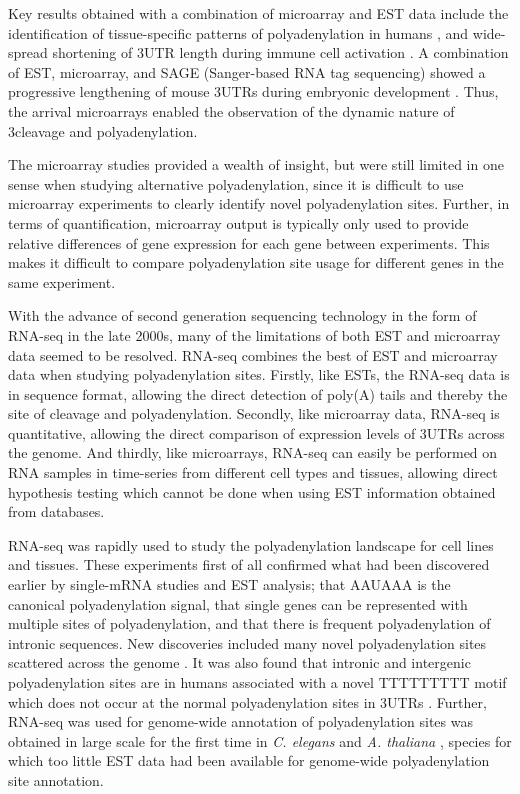 Key results obtained with a combination of microarray and EST data include the
identification of tissue-specific patterns of polyadenylation in humans
\cite{zhang_biased_2005}, and wide-spread shortening of 3\ppp UTR length during
immune cell activation \cite{sandberg_proliferating_2008}. A combination of
EST, microarray, and SAGE (Sanger-based RNA tag sequencing) showed a
progressive lengthening of mouse 3\ppp UTRs during embryonic development
\cite{ji_progressive_2009}. Thus, the arrival microarrays enabled the
observation of the dynamic nature of 3\ppp cleavage and polyadenylation.

The microarray studies provided a wealth of insight, but were still limited in
one sense when studying alternative polyadenylation, since it is difficult to
use microarray experiments to clearly identify novel polyadenylation sites. Further, in
terms of quantification, microarray output is typically only used to provide
relative differences of gene expression for each gene between experiments. This
makes it difficult to compare polyadenylation site usage for different genes in the
same experiment.

With the advance of second generation sequencing technology in the form of
RNA-seq in the late 2000s, many of the limitations of both EST and microarray
data seemed to be resolved. RNA-seq combines the best of EST and microarray
data when studying polyadenylation sites. Firstly, like ESTs, the RNA-seq data
is in sequence format, allowing the direct detection of poly(A) tails and
thereby the site of cleavage and polyadenylation. Secondly, like microarray
data, RNA-seq is quantitative, allowing the direct comparison of expression
levels of 3\ppp UTRs across the genome. And thirdly, like microarrays, RNA-seq
can easily be performed on RNA samples in time-series from different cell types
and tissues, allowing direct hypothesis testing which cannot be done when using
EST information obtained from databases. 

RNA-seq was rapidly used to study the polyadenylation landscape for cell lines
and tissues. These experiments first of all confirmed what had been discovered
earlier by single-mRNA studies and EST analysis; that AAUAAA is the canonical
polyadenylation signal, that single genes can be represented with multiple
sites of polyadenylation, and that there is frequent polyadenylation of
intronic sequences. New discoveries included many novel polyadenylation sites
scattered across the genome \cite{ozsolak_comprehensive_2010,
derti_quantitative_2012}. It was also found that intronic and intergenic
polyadenylation sites are in humans associated with a novel TTTTTTTTT motif which does
not occur at the normal polyadenylation sites in 3\ppp UTRs
\cite{ozsolak_comprehensive_2010}. Further, RNA-seq was used for genome-wide
annotation of polyadenylation sites was obtained in large scale for the first time in
\textit{C. elegans} and \textit{A. thaliana} \cite{mangone_landscape_2010,
wu_genome-wide_2011}, species for which too little EST data had been available
for genome-wide polyadenylation site annotation.

